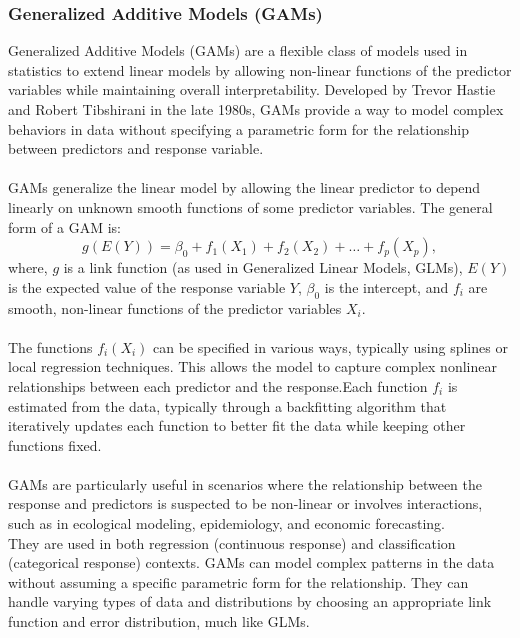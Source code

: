 \documentclass[12pt]{article}
\begin{document}
\subsubsection{Generalized Additive Models (GAMs)}
Generalized Additive Models (GAMs) are a flexible class of models used in statistics to
extend linear models by allowing non-linear functions of the predictor variables while
maintaining overall interpretability. Developed by Trevor Hastie and Robert Tibshirani in
the late 1980s, GAMs provide a way to model complex behaviors in data without specifying
a parametric form for the relationship between predictors and response variable.\\
\\
GAMs generalize the linear model by allowing the linear predictor to depend linearly on
unknown smooth functions of some predictor variables. The general form of a GAM is:
\begin{equation}
   g(E(Y)) = \beta_0 + f_1(X_1) + f_2(X_2) + \ldots + f_p(X_p),
\end{equation}
where, \( g \) is a link function (as used in Generalized Linear
Models, GLMs), \( E(Y) \) is the expected value of the response
variable \( Y \), \( \beta_0 \) is the intercept, and \( f_i \) are smooth,
non-linear functions of the predictor variables \( X_i \).\\
\\
The functions \( f_i(X_i) \) can be specified in various ways, typically using splines
or local regression techniques. This allows the model to capture complex nonlinear
relationships between each predictor and the response.Each function \( f_i \) is
estimated from the data, typically through a backfitting algorithm that iteratively
updates each function to better fit the data while keeping other functions fixed.\\
\\
GAMs are particularly useful in scenarios where the relationship between the response and
predictors is suspected to be non-linear or involves interactions, such as in ecological
modeling, epidemiology, and economic forecasting.\\
They are used in both regression (continuous response) and classification (categorical
response) contexts. GAMs can model complex patterns in the data without assuming a specific
parametric form for the relationship. They can handle varying types of data and
distributions by choosing an appropriate link function and error distribution, much like
GLMs.\\
\end{document}
